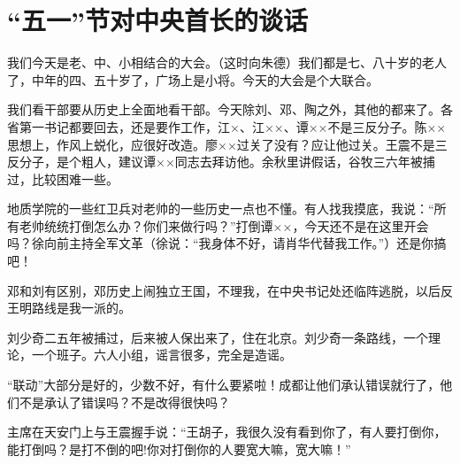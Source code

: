 \section[ “五一”节对中央首长的谈话（一九六七年五月一日）]{ “五一”节对中央首长的谈话}


我们今天是老、中、小相结合的大会。（这时向朱德）我们都是七、八十岁的老人了，中年的四、五十岁了，广场上是小将。今天的大会是个大联合。

我们看干部要从历史上全面地看干部。今天除刘、邓、陶之外，其他的都来了。各省第一书记都要回去，还是要作工作，江×、江××、谭××不是三反分子。陈××思想上，作风上蜕化，应很好改造。廖××过关了没有？应让他过关。王震不是三反分子，是个粗人，建议谭××同志去拜访他。余秋里讲假话，谷牧三六年被捕过，比较困难一些。

地质学院的一些红卫兵对老帅的一些历史一点也不懂。有人找我摸底，我说：“所有老帅统统打倒怎么办？你们来做行吗？”打倒谭××，今天还不是在这里开会吗？徐向前主持全军文革（徐说：“我身体不好，请肖华代替我工作。”）还是你搞吧！

邓和刘有区别，邓历史上闹独立王国，不理我，在中央书记处还临阵逃脱，以后反王明路线是我一派的。

刘少奇二五年被捕过，后来被人保出来了，住在北京。刘少奇一条路线，一个理论，一个班子。六人小组，谣言很多，完全是造谣。

“联动”大部分是好的，少数不好，有什么要紧啦！成都让他们承认错误就行了，他们不是承认了错误吗？不是改得很快吗？

主席在天安门上与王震握手说：“王胡子，我很久没有看到你了，有人要打倒你，能打倒吗？是打不倒的吧!你对打倒你的人要宽大嘛，宽大嘛！”

